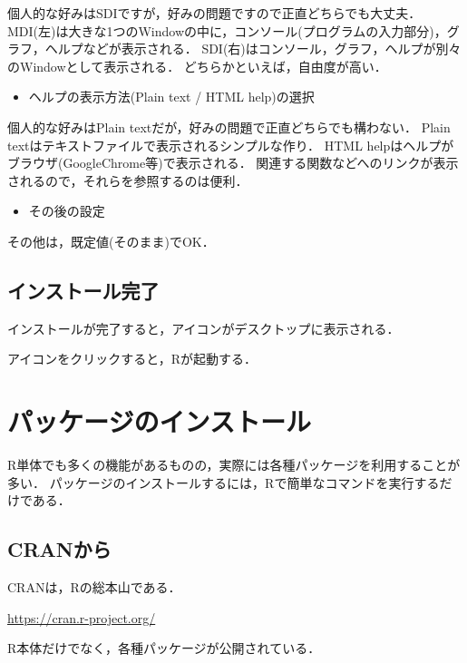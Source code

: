 \documentclass[
]{article}
\providecommand{\tightlist}{%
  \setlength{\itemsep}{0pt}\setlength{\parskip}{0pt}}
\begin{document}
個人的な好みはSDIですが，好みの問題ですので正直どちらでも大丈夫．
MDI(左)は大きな1つのWindowの中に，コンソール(プログラムの入力部分)，グラフ，ヘルプなどが表示される．
SDI(右)はコンソール，グラフ，ヘルプが別々のWindowとして表示される．
どちらかといえば，自由度が高い．

\begin{itemize}
\tightlist
\item
  ヘルプの表示方法(Plain text / HTML help)の選択
\end{itemize}

個人的な好みはPlain textだが，好みの問題で正直どちらでも構わない．
Plain textはテキストファイルで表示されるシンプルな作り．
HTML helpはヘルプがブラウザ(GoogleChrome等)で表示される．
関連する関数などへのリンクが表示されるので，それらを参照するのは便利．

\begin{itemize}
\tightlist
\item
  その後の設定
\end{itemize}

その他は，既定値(そのまま)でOK．

\hypertarget{ux30a4ux30f3ux30b9ux30c8ux30fcux30ebux5b8cux4e86}{%
\subsection{インストール完了}\label{ux30a4ux30f3ux30b9ux30c8ux30fcux30ebux5b8cux4e86}}

インストールが完了すると，アイコンがデスクトップに表示される．

アイコンをクリックすると，Rが起動する．

\hypertarget{package}{%
\section{パッケージのインストール}\label{package}}

R単体でも多くの機能があるものの，実際には各種パッケージを利用することが多い．
パッケージのインストールするには，Rで簡単なコマンドを実行するだけである．

\hypertarget{cran}{%
\subsection{CRANから}\label{cran}}

CRANは，Rの総本山である．

\url{https://cran.r-project.org/}

R本体だけでなく，各種パッケージが公開されている．
\end{document}
